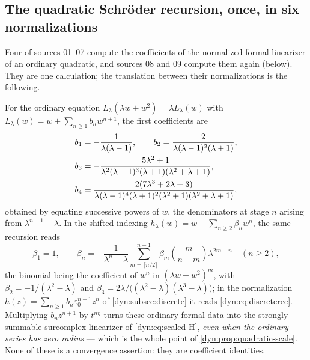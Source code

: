 \documentclass[11pt,letterpaper]{article}
\theoremstyle{definition}
\theoremstyle{remark}
\newcommand{\eps}{\varepsilon}
\numberwithin{equation}{section}
\begin{document}
\subsection{The quadratic Schr\"oder recursion, once, in six normalizations}
\label{dyn:subsec:quadratic}

Four of sources 01--07 compute the coefficients of the normalized formal
linearizer of an ordinary quadratic, and sources 08 and 09 compute them
again (below). They are one calculation; the translation between
their normalizations is the following.

For the ordinary equation
$L_\lambda(\lambda w+w^{2})=\lambda L_\lambda(w)$ with
$L_\lambda(w)=w+\sum_{n\ge1}b_nw^{n+1}$, the first coefficients are
\begin{align}\label{dyn:eq:quadratic-bs}
 b_1&=-\frac1{\lambda(\lambda-1)},\qquad
 b_2=\frac2{\lambda(\lambda-1)^{2}(\lambda+1)},\\
 b_3&=-\frac{5\lambda^{2}+1}
 {\lambda^{2}(\lambda-1)^{3}(\lambda+1)(\lambda^{2}+\lambda+1)},\notag\\
 b_4&=\frac{2(7\lambda^{3}+2\lambda+3)}
 {\lambda(\lambda-1)^{4}(\lambda+1)^{2}(\lambda^{2}+1)
 (\lambda^{2}+\lambda+1)},\notag
\end{align}
obtained by equating successive powers of $w$, the denominators at stage
$n$ arising from $\lambda^{n+1}-\lambda$. In the shifted indexing
$h_\lambda(w)=w+\sum_{n\ge2}\beta_nw^{n}$, the same recursion reads
\begin{equation}\label{dyn:eq:quadraticrecurrence}
 \beta_1=1,\qquad
 \beta_n=-\frac1{\lambda^{n}-\lambda}\sum_{m=\lceil n/2\rceil}^{n-1}
 \beta_m\binom{m}{n-m}\lambda^{2m-n}\quad(n\ge2),
\end{equation}
the binomial being the coefficient of $w^{n}$ in $(\lambda w+w^{2})^{m}$,
with $\beta_2=-1/(\lambda^{2}-\lambda)$ and
$\beta_3=2\lambda/\bigl((\lambda^{2}-\lambda)(\lambda^{3}-\lambda)\bigr)$;
in the normalization $h(z)=\sum_{n\ge1}b_n\eps_0^{n-1}z^{n}$ of
\cref{dyn:subsec:discrete} it reads
\eqref{dyn:eq:discreterec}. Multiplying $b_nz^{n+1}$ by $t^{n\eta}$ turns
these ordinary formal data into the strongly summable surcomplex linearizer
of \eqref{dyn:eq:scaled-H}, \emph{even when the ordinary series has zero
radius} --- which is the whole point of \cref{dyn:prop:quadratic-scale}.
None of these is a convergence assertion: they are coefficient identities.
\end{document}
